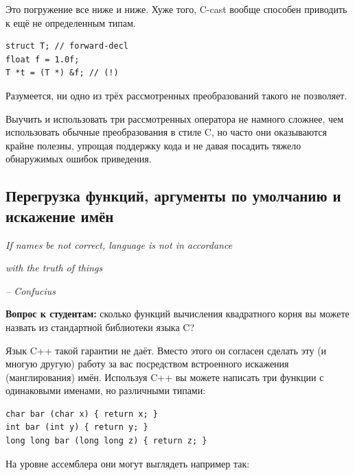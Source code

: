 \documentclass[a4paper,12pt,oneside]{article}
\newif\ifanswers
\begin{document}
Это погружение все ниже и ниже. Хуже того, C-cast вообще способен приводить к ещё не определенным типам.

\begin{lstlisting}
struct T; // forward-decl
float f = 1.0f;
T *t = (T *) &f; // (!)
\end{lstlisting}

Разумеется, ни одно из трёх рассмотренных преобразований такого не позволяет.

Выучить и использовать три рассмотренных оператора не намного сложнее, чем использовать обычные преобразования в стиле C, но часто они оказываются крайне полезны, упрощая поддержку кода и не давая посадить тяжело обнаружимых ошибок приведения.

\pagebreak
\subsection{Перегрузка функций, аргументы по умолчанию и искажение имён}\label{NameResolution}

\hfill\textit{If names be not correct, language is not in accordance}

\hfill\textit{with the truth of things}{\vspace{0.5em}}

\hfill\textit{-- Confucius}

\textbf{Вопрос к студентам:} сколько функций вычисления квадратного корня вы можете назвать из стандартной библиотеки языка C?

\ifanswers
Правильный ответ: три (7.12.7.5) \lstinline!sqrtf!, \lstinline!sqrt! и \lstinline!sqrtl!. Три функции с разными именами понадобилось вводить потому, что они принимают аргументы разных типов, а язык C предоставляет достаточно сильную гарантию того, что любое имя, использованное в вашей программе будет отображено в ассемблер вашей целевой машины один к одному, без искажения.
\fi

Язык C++ такой гарантии не даёт. Вместо этого он согласен сделать эту (и многую другую) работу за вас посредством встроенного искажения (манглирования) имён. Используя C++ вы можете написать три функции с одинаковыми именами, но различными типами:

\begin{lstlisting}
char bar (char x) { return x; }
int bar (int y) { return y; }
long long bar (long long z) { return z; }
\end{lstlisting}

На уровне ассемблера они могут выглядеть например так:
\end{document}

